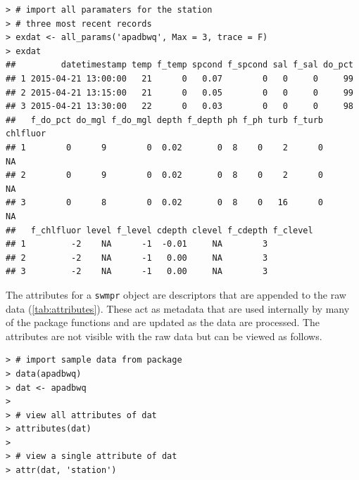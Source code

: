 \documentclass[10pt,letterpaper]{article}\usepackage[]{graphicx}\usepackage[]{color}
\makeatletter
\newenvironment{kframe}{%
 \def\at@end@of@kframe{}%
 \ifinner\ifhmode%
  \def\at@end@of@kframe{\end{minipage}}%
  \begin{minipage}{\columnwidth}%
 \fi\fi%
 \def\FrameCommand##1{\hskip\@totalleftmargin \hskip-\fboxsep
 \colorbox{shadecolor}{##1}\hskip-\fboxsep
     \hskip-\linewidth \hskip-\@totalleftmargin \hskip\columnwidth}%
 \MakeFramed {\advance\hsize-\width
   \@totalleftmargin\z@ \linewidth\hsize
   \@setminipage}}%
 {\par\unskip\endMakeFramed%
 \at@end@of@kframe}
\newenvironment{knitrout}{}{} %
\makeatother
\begin{document}
\begin{knitrout}\small
{}\color{fgcolor}\begin{kframe}
\begin{verbatim}
> # import all paramaters for the station
> # three most recent records
> exdat <- all_params('apadbwq', Max = 3, trace = F)
> exdat
##         datetimestamp temp f_temp spcond f_spcond sal f_sal do_pct
## 1 2015-04-21 13:00:00   21      0   0.07        0   0     0     99
## 2 2015-04-21 13:15:00   21      0   0.05        0   0     0     99
## 3 2015-04-21 13:30:00   22      0   0.03        0   0     0     98
##   f_do_pct do_mgl f_do_mgl depth f_depth ph f_ph turb f_turb chlfluor
## 1        0      9        0  0.02       0  8    0    2      0       NA
## 2        0      9        0  0.02       0  8    0    2      0       NA
## 3        0      8        0  0.02       0  8    0   16      0       NA
##   f_chlfluor level f_level cdepth clevel f_cdepth f_clevel
## 1         -2    NA      -1  -0.01     NA        3         
## 2         -2    NA      -1   0.00     NA        3         
## 3         -2    NA      -1   0.00     NA        3
\end{verbatim}
\end{kframe}
\end{knitrout}

The attributes for a \texttt{swmpr} object are descriptors that are appended to the raw data (\cref{tab:attributes}).  These act as metadata that are used internally by many of the package functions and are updated as the data are processed. The attributes are not visible with the raw data but can be viewed as follows.

\begin{knitrout}\small
{}\color{fgcolor}\begin{kframe}
\begin{verbatim}
> # import sample data from package
> data(apadbwq)
> dat <- apadbwq
> 
> # view all attributes of dat
> attributes(dat)
>  
> # view a single attribute of dat
> attr(dat, 'station')
\end{verbatim}
\end{kframe}
\end{knitrout}
 
\end{document}

